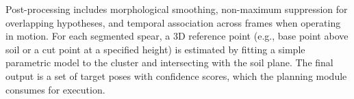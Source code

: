 Post-processing includes morphological smoothing, non-maximum suppression for overlapping hypotheses, and temporal association across frames when operating in motion. For each segmented spear, a 3D reference point (e.g., base point above soil or a cut point at a specified height) is estimated by fitting a simple parametric model to the cluster and intersecting with the soil plane. The final output is a set of target poses with confidence scores, which the planning module consumes for execution.

